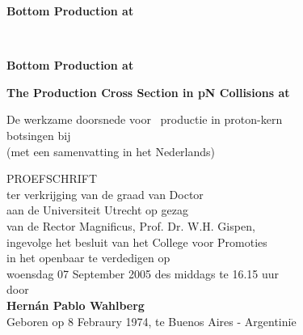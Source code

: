 \thispagestyle{empty}

\vspace*{4cm}

\begin{center}
{\bf \huge Bottom Production at \\}
\vspace{1cm}
{\bf \huge {}}
\end{center}

\newpage
\thispagestyle{empty}
\mbox{} \\

\vfill

\newpage

\thispagestyle{empty}
\begin{center}
{\bf \huge Bottom Production at \\}
\vspace{1cm}
{\bf \huge {}}

\vspace*{2cm}

{\bf\Large The \boldmath{\bbar} Production Cross Section in pN Collisions at \\}

\vspace{1cm}

{\Large De werkzame doorsnede voor \bbbar\ productie in proton-kern \\
\vspace{.1cm}
 botsingen bij \\
(met een samenvatting in het Nederlands)\\
\vspace{2.cm}
}

{\large\sc  PROEFSCHRIFT} \\
\vspace{1.5cm}
{\large\sc 
ter verkrijging van de graad van Doctor\\
aan de Universiteit Utrecht op gezag\\
van de Rector Magnificus, Prof. Dr. W.H. Gispen, \\
ingevolge het besluit van het College voor Promoties \\
in het openbaar te verdedigen op \\
woensdag 07 September 2005 des middags te 16.15 uur}\\
\vfill
{\sc \large door\\}
\vspace{1.cm}
{\Large \bf Hern\'an Pablo Wahlberg \\}
\vspace{0.5cm}
{  Geboren op 8 Febraury 1974, te Buenos Aires - Argentini$\ddot{\mathrm{e}}$ }
\end{center}

